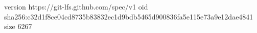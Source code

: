 version https://git-lfs.github.com/spec/v1
oid sha256:c32d1f8ce04cd8735b83832ec1d9bdb5465d900836fa5e115e73a9e12dae4841
size 6267
